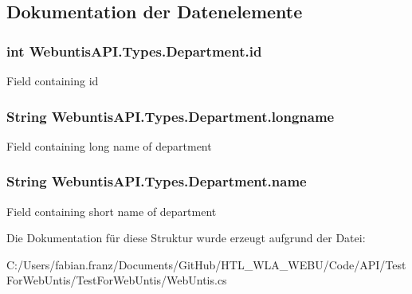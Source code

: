 \subsection{Dokumentation der Datenelemente}
\hypertarget{struct_webuntis_a_p_i_1_1_types_1_1_department_a543d6d34378c9649d7cf72ea88bfbb61}{
\subsubsection[{id}]{\setlength{\rightskip}{0pt plus 5cm}int Webuntis\-A\-P\-I.\-Types.\-Department.\-id}}\label{struct_webuntis_a_p_i_1_1_types_1_1_department_a543d6d34378c9649d7cf72ea88bfbb61}
Field containing id \hypertarget{struct_webuntis_a_p_i_1_1_types_1_1_department_ac9d9a76d977fbdccfd18a7f88c88fbac}{
\subsubsection[{longname}]{\setlength{\rightskip}{0pt plus 5cm}String Webuntis\-A\-P\-I.\-Types.\-Department.\-longname}}\label{struct_webuntis_a_p_i_1_1_types_1_1_department_ac9d9a76d977fbdccfd18a7f88c88fbac}
Field containing long name of department \hypertarget{struct_webuntis_a_p_i_1_1_types_1_1_department_aa2a3990003b54bc6a9946be1c2ab5572}{
\subsubsection[{name}]{\setlength{\rightskip}{0pt plus 5cm}String Webuntis\-A\-P\-I.\-Types.\-Department.\-name}}\label{struct_webuntis_a_p_i_1_1_types_1_1_department_aa2a3990003b54bc6a9946be1c2ab5572}
Field containing short name of department 

Die Dokumentation für diese Struktur wurde erzeugt aufgrund der Datei\-:\begin{DoxyCompactItemize}
\item 
C\-:/\-Users/fabian.\-franz/\-Documents/\-Git\-Hub/\-H\-T\-L\-\_\-\-W\-L\-A\-\_\-\-W\-E\-B\-U/\-Code/\-A\-P\-I/\-Test\-For\-Web\-Untis/\-Test\-For\-Web\-Untis/Web\-Untis.\-cs\end{DoxyCompactItemize}
